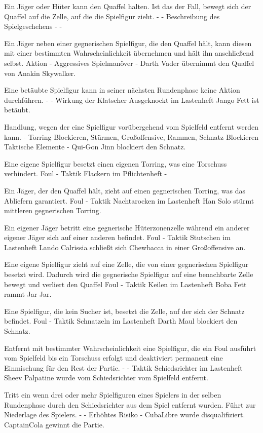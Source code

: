 {Ein Jäger oder Hüter kann den Quaffel halten. Ist das der Fall, bewegt sich der Quaffel auf die Zelle, auf die die Spielfigur zieht.}
{-}
{-}
{Beschreibung des Spielgeschehens}
{-}
{-}

{Ein Jäger neben einer gegnerischen Spielfigur, die den Quaffel hält, kann diesen mit einer bestimmten Wahrscheinlichkeit übernehmen und hält ihn anschließend selbst.}
{Aktion}
{-}
{Aggressives Spielmanöver}
{-}
{Darth Vader übernimmt den Quaffel von Anakin Skywalker.}

{Eine betäubte Spielfigur kann in seiner nächsten Rundenphase keine Aktion durchführen.}
{-}
{-}
{Wirkung der Klatscher}
{\glqq{}Ausgeknockt\grqq{}  im Lastenheft}
{Jango Fett ist betäubt.}

{Handlung, wegen der eine Spielfigur vorübergehend vom Spielfeld entfernt werden kann.}
{-}
{Torring Blockieren, Stürmen, Großoffensive, Rammen, Schnatz Blockieren}
{Taktische Elemente}
{-}
{Qui-Gon Jinn blockiert den Schnatz.}

{Eine eigene Spielfigur besetzt einen eigenen Torring, was eine Torschuss verhindert.}
{Foul}
{-}
{Taktik}
{\glqq{}Flackern\grqq{}  im Pflichtenheft}
{-}

{Ein Jäger, der den Quaffel hält, zieht auf einen gegnerischen Torring, was das Abliefern garantiert.}
{Foul}
{-}
{Taktik}
{\glqq{}Nachtarocken\grqq{}  im Lastenheft}
{Han Solo stürmt mittleren gegnerischen Torring.}

{Ein eigener Jäger betritt eine gegnerische Hüterzonenzelle während ein anderer eigener Jäger sich auf einer anderen befindet.}
{Foul}
{-}
{Taktik}
{\glqq{}Stutschen\grqq{}  im Lastenheft}
{Lando Calrissia schließt sich Chewbacca in einer Großoffensive an.}

{Eine eigene Spielfigur zieht auf eine Zelle, die von einer gegnerischen Spielfigur besetzt wird. Dadurch wird die gegnerische Spielfigur auf eine benachbarte Zelle bewegt und verliert den Quaffel}
{Foul}
{-}
{Taktik}
{\glqq{}Keilen\grqq{}  im Lastenheft}
{Boba Fett rammt Jar Jar.}

{Eine Spielfigur, die kein Sucher ist, besetzt die Zelle, auf der sich der Schnatz befindet.}
{Foul}
{-}
{Taktik}
{\glqq{}Schnatzeln\grqq{}  im Lastenheft}
{Darth Maul blockiert den Schnatz.}

{Entfernt mit bestimmter Wahrscheinlichkeit eine Spielfigur, die ein Foul ausführt vom Spielfeld bis ein Torschuss erfolgt und deaktiviert permanent eine Einmischung für den Rest der Partie.}
{-}
{-}
{Taktik}
{\glqq{}Schiedsrichter\grqq{}  im Lastenheft}
{Sheev Palpatine wurde vom Schiedsrichter vom Spielfeld entfernt.}

{Tritt ein wenn drei oder mehr Spielfiguren eines Spielers in der selben Rundenphase durch den Schiedsrichter aus dem Spiel entfernt wurden. Führt zur Niederlage des Spielers.}
{-}
{-}
{Erhöhtes Risiko}
{-}
{CubaLibre wurde disqualifiziert. CaptainCola gewinnt die Partie.}
